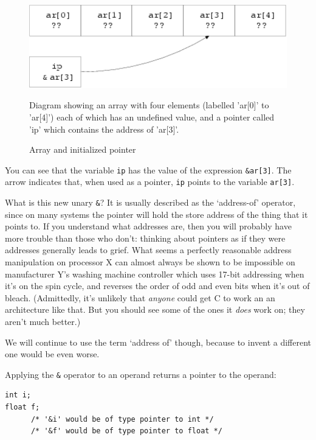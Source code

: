    \begin{figure}\centering
      \includegraphics[type=pdf,read=.pdf,ext=.pdf,scale=0.9]
      {figure/5.4_arrInitPtr}
      \caption*{Diagram showing an array with four elements
        (labelled 'ar[0]' to 'ar[4]') each of which has an undefined value,
        and a pointer called 'ip' which contains the address of 'ar[3]'.}
      \caption{\label{fig:arrInitPtr}Array and initialized pointer}
    \end{figure}



   You can see that the variable \texttt{ip} has the value of the
    expression \texttt{\&ar[3]}. The arrow indicates that, when used
    as a pointer, \texttt{ip} points to the variable
    \texttt{ar[3]}.


   What is this new unary \texttt{\&}? It is usually described as
    the `address-of' operator, since on many systems the pointer will
    hold the store address of the thing that it points to. If you understand
    what addresses are, then you will probably have more trouble than those
    who don't: thinking about pointers as if they were addresses generally
    leads to grief. What seems a perfectly reasonable address manipulation
    on processor X can almost always be shown to be impossible on
    manufacturer Y's washing machine controller which uses 17-bit addressing
    when it's on the spin cycle, and reverses the order of odd and even bits
    when it's out of bleach. (Admittedly, it's unlikely that \textit{anyone}
    could get C to work an an architecture like that. But you should see
    some of the ones it \textit{does} work on; they aren't much better.)


   We will continue to use the term `address of' though, because to
    invent a different one would be even worse.


   Applying the \texttt{\&} operator to an operand returns
    a pointer to the operand:


   \begin{Verbatim}
int i;
float f;
      /* '&i' would be of type pointer to int */
      /* '&f' would be of type pointer to float */
\end{Verbatim}

